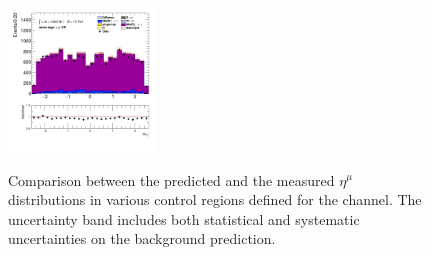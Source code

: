 \begin{figure}[!htp]
\begin{center}
			\includegraphics[width=0.35\textwidth]{chapters/chapter6_HPlus/images/taulep/mu_0_eta_SS_TAUMU.png} \\
			\end{center}
			\caption{
			Comparison between the predicted and the measured $\eta^{\mu}$ distributions in various control regions defined for the \taulep channel. The uncertainty band includes both statistical and systematic uncertainties on the background prediction. 
			}
			\label{fig:bkg-eta-mu-taulep}
		\end{figure}

